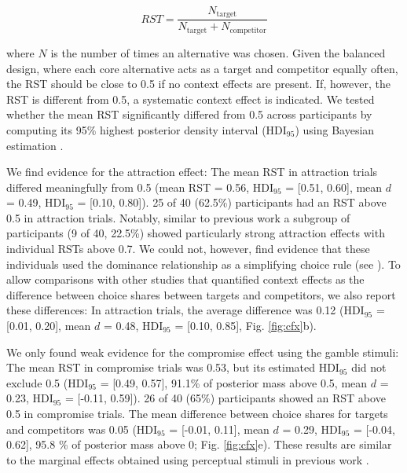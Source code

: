 \documentclass[11pt, a4paper]{article}
\begin{document}
\begin{equation}
    RST = \frac{N_{\text{target}}}{N_{\text{target}} + N_{\text{competitor}}}
\end{equation}

where $N$ is the number of times an alternative was chosen. Given the balanced design, where each core alternative acts as a target and competitor equally often, the RST should be close to 0.5 if no context effects are present. If, however, the RST is different from 0.5, a systematic context effect is indicated. We tested whether the mean RST significantly differed from 0.5 across participants by computing its 95\% highest posterior density interval (HDI$_{95}$) using Bayesian estimation \parencite[BEST;][]{kruschke2013BayesianEstimationSupersedes,kruschke2014DoingBayesianData}. 

We find evidence for the attraction effect: The mean RST in attraction trials differed meaningfully from 0.5 (mean RST = 0.56, HDI$_{95}$ = [0.51, 0.60], mean $d$ = 0.49, HDI$_{95}$ = [0.10, 0.80]). 25 of 40 (62.5\%) participants had an RST above 0.5 in attraction trials. Notably, similar to previous work \parencite[e.g.,][]{trueblood2012MultialternativeContextEffects} a subgroup of participants (9 of 40, 22.5\%) showed particularly strong attraction effects with individual RSTs above 0.7. We could not, however, find evidence that these individuals used the dominance relationship as a simplifying choice rule (see ). To allow comparisons with other studies that quantified context effects as the difference between choice shares between targets and competitors, we also report these differences: In attraction trials, the average difference was 0.12 (HDI$_{95}$ = [0.01, 0.20], mean $d$ = 0.48, HDI$_{95}$ = [0.10, 0.85], Fig. \ref{fig:cfx}b). 

We only found weak evidence for the compromise effect using the gamble stimuli: The mean RST in compromise trials was 0.53, but its estimated HDI$_{95}$ did not exclude 0.5 (HDI$_{95}$ = [0.49, 0.57], 91.1\% of posterior mass above 0.5, mean $d$ = 0.23, HDI$_{95}$ = [-0.11, 0.59]). 26 of 40 (65\%) participants showed an RST above 0.5 in compromise trials. The mean difference between choice shares for targets and competitors was 0.05 (HDI$_{95}$ = [-0.01, 0.11], mean $d$ = 0.29, HDI$_{95}$ = [-0.04, 0.62], 95.8 \% of posterior mass above 0; Fig. \ref{fig:cfx}e). These results are similar to the marginal effects obtained using perceptual stimuli in previous work \parencite{trueblood2015FragileNatureContextual,trueblood2013NotJustConsumers}. 
\end{document}

